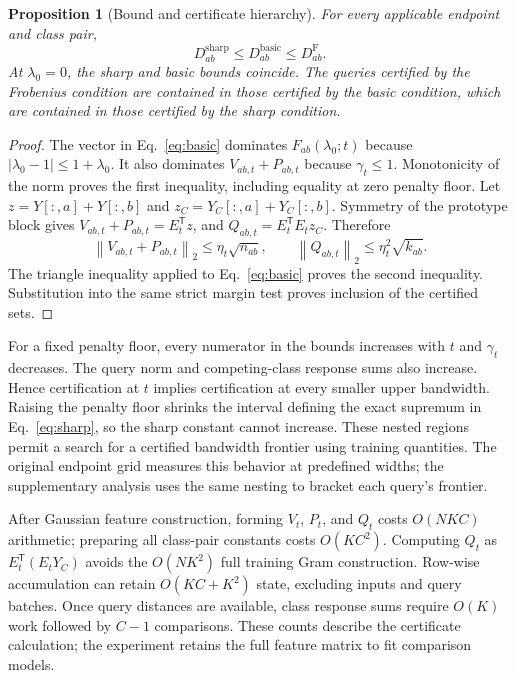 \documentclass[preprint,12pt]{elsarticle}
\newtheorem{proposition}{Proposition}
\newcommand{\norm}[1]{\left\lVert#1\right\rVert}
\newcommand{\tr}{\mathsf{T}}
\newcommand{\sharpb}{\mathrm{sharp}}
\newcommand{\basicb}{\mathrm{basic}}
\newcommand{\frobb}{\mathrm{F}}
\begin{document}
\begin{proposition}[Bound and certificate hierarchy]
For every applicable endpoint and class pair,
\begin{equation}
 D^{\sharpb}_{ab}\leq D^{\basicb}_{ab}\leq D^{\frobb}_{ab}.
 \label{eq:hierarchy}
\end{equation}
At $\lambda_0=0$, the sharp and basic bounds coincide. The queries certified by the Frobenius condition are contained in those certified by the basic condition, which are contained in those certified by the sharp condition.
\end{proposition}
\begin{proof}
The vector in Eq.~\eqref{eq:basic} dominates $F_{ab}(\lambda_0;t)$ because $|\lambda_0-1|\leq1+\lambda_0$. It also dominates $V_{ab,t}+P_{ab,t}$ because $\gamma_t\leq1$. Monotonicity of the norm proves the first inequality, including equality at zero penalty floor. Let $z=Y[:,a]+Y[:,b]$ and $z_C=Y_C[:,a]+Y_C[:,b]$. Symmetry of the prototype block gives $V_{ab,t}+P_{ab,t}=E_t^\tr z$, and $Q_{ab,t}=E_t^\tr E_tz_C$. Therefore
\[
 \norm{V_{ab,t}+P_{ab,t}}_2\leq\eta_t\sqrt{n_{ab}},
 \qquad
 \norm{Q_{ab,t}}_2\leq\eta_t^2\sqrt{k_{ab}}.
\]
The triangle inequality applied to Eq.~\eqref{eq:basic} proves the second inequality. Substitution into the same strict margin test proves inclusion of the certified sets.
\end{proof}

For a fixed penalty floor, every numerator in the bounds increases with $t$ and $\gamma_t$ decreases. The query norm and competing-class response sums also increase. Hence certification at $t$ implies certification at every smaller upper bandwidth. Raising the penalty floor shrinks the interval defining the exact supremum in Eq.~\eqref{eq:sharp}, so the sharp constant cannot increase. These nested regions permit a search for a certified bandwidth frontier using training quantities. The original endpoint grid measures this behavior at predefined widths; the supplementary analysis uses the same nesting to bracket each query's frontier.

After Gaussian feature construction, forming $V_t$, $P_t$, and $Q_t$ costs $O(NKC)$ arithmetic; preparing all class-pair constants costs $O(KC^2)$. Computing $Q_t$ as $E_t^\tr(E_tY_C)$ avoids the $O(NK^2)$ full training Gram construction. Row-wise accumulation can retain $O(KC+K^2)$ state, excluding inputs and query batches. Once query distances are available, class response sums require $O(K)$ work followed by $C-1$ comparisons. These counts describe the certificate calculation; the experiment retains the full feature matrix to fit comparison models.
\end{document}
